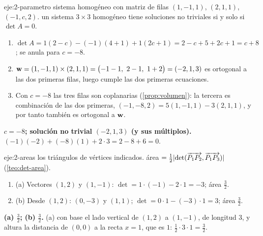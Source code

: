 \begin{solucion}{eje:2-parametro}
\datos sistema homogéneo con matriz de filas $(1,-1,1)$, $(2,1,1)$, $(-1,c,2)$.
\planteamiento un sistema $3\times3$ homogéneo tiene soluciones no triviales si y solo si $\det A=0$.
\pasos
\begin{enumerate}[label=\arabic*.]
  \item $\det A=1(2-c)-(-1)(4+1)+1(2c+1)=2-c+5+2c+1=c+8$; se anula para $c=-8$.
  \item $\vw=(1,-1,1)\times(2,1,1)=\bigl(-1-1,\ 2-1,\ 1+2\bigr)=(-2,1,3)$ es ortogonal a las dos primeras filas, luego cumple las dos primeras ecuaciones.
  \item Con $c=-8$ las tres filas son coplanarias (\cref{prop:volumen}): la tercera es combinación de las dos primeras, $(-1,-8,2)=5(1,-1,1)-3(2,1,1)$, y por tanto también es ortogonal a $\mathbf{w}$.
\end{enumerate}
\resultado \textbf{$c=-8$; solución no trivial $(-2,1,3)$ (y sus múltiplos).}
\comprobacion $(-1)(-2)+(-8)(1)+2\cdot3=2-8+6=0$.
\end{solucion}

\begin{solucion}{eje:2-areas}
\datos los triángulos de vértices indicados.
\planteamiento área $=\frac12\lvert\det(\overrightarrow{P_1P_2},\overrightarrow{P_1P_3})\rvert$ (\cref{teo:det-area}).
\pasos
\begin{enumerate}[label=\arabic*.]
  \item (a) Vectores $(1,2)$ y $(1,-1)$: $\det=1\cdot(-1)-2\cdot1=-3$; área $\frac32$.
  \item (b) Desde $(1,2)$: $(0,-3)$ y $(1,1)$; $\det=0\cdot1-(-3)\cdot1=3$; área $\frac32$.
\end{enumerate}
\resultado \textbf{(a) $\frac32$; (b) $\frac32$.}
\comprobacion (a) con base el lado vertical de $(1,2)$ a $(1,-1)$, de longitud $3$, y altura la distancia de $(0,0)$ a la recta $x=1$, que es $1$: $\frac12\cdot3\cdot1=\frac32$.
\end{solucion}

